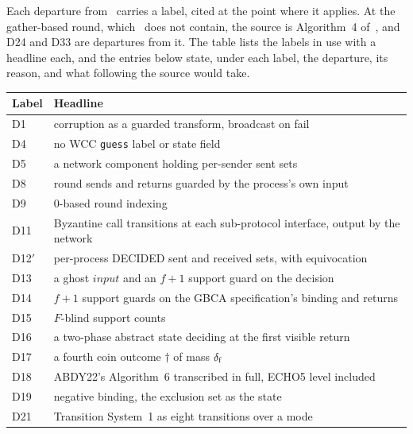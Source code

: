 
Each departure from~\cite{LeslieBP} carries a label, cited at the point where it applies.
At the gather-based round, which~\cite{LeslieBP} does not contain, the source is Algorithm~4 of~\cite{AFW25}, and D24 and D33 are departures from it.
The table lists the labels in use with a headline each, and the entries below state, under each label, the departure, its reason, and what following the source would take.

\begin{center}
\footnotesize \setlength{\tabcolsep}{4pt}
\begin{tabular}{lp{12cm}}
\hline
Label & Headline \\
\hline
D1 & corruption as a guarded transform, broadcast on fail \\
D4 & no WCC \texttt{guess} label or state field \\
D5 & a network component holding per-sender sent sets \\
D8 & round sends and returns guarded by the process's own input \\
D9 & $0$-based round indexing \\
D11 & Byzantine call transitions at each sub-protocol interface, output by the network \\
D12$'$ & per-process DECIDED sent and received sets, with equivocation \\
D13 & a ghost $input$ and an $f+1$ support guard on the decision \\
D14 & $f+1$ support guards on the GBCA specification's binding and returns \\
D15 & $F$-blind support counts \\
D16 & a two-phase abstract state deciding at the first visible return \\
D17 & a fourth coin outcome $\dagger$ of mass $\delta_{\mathrm{f}}$ \\
D18 & ABDY22's Algorithm~6 transcribed in full, ECHO5 level included \\
D19 & negative binding, the exclusion set as the state \\
D21 & Transition System~1 as eight transitions over a mode \\

\end{tabular}
\end{center}
